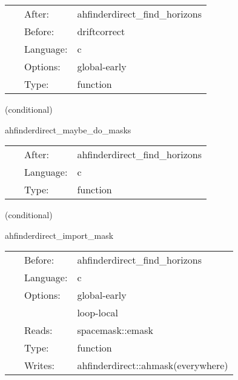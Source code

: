  \begin{tabular*}{160mm}{cll} 
~ & After:  & ahfinderdirect\_find\_horizons \\ 
~ & Before:  & driftcorrect \\ 
~ & Language:  & c \\ 
~ & Options:  & global-early \\ 
~ & Type:  & function \\ 
\end{tabular*} 


\vspace{5mm}

   (conditional) 

\hspace{5mm} ahfinderdirect\_maybe\_do\_masks 

\hspace{5mm}{\it set mask(s) based on apparent horizon position(s) } 


\hspace{5mm}

 \begin{tabular*}{160mm}{cll} 
~ & After:  & ahfinderdirect\_find\_horizons \\ 
~ & Language:  & c \\ 
~ & Type:  & function \\ 
\end{tabular*} 


\vspace{5mm}

   (conditional) 

\hspace{5mm} ahfinderdirect\_import\_mask 

\hspace{5mm}{\it import the excision mask } 


\hspace{5mm}

 \begin{tabular*}{160mm}{cll} 
~ & Before:  & ahfinderdirect\_find\_horizons \\ 
~ & Language:  & c \\ 
~ & Options:  & global-early \\ 
~& ~ &loop-local\\ 
~ & Reads:  & spacemask::emask \\ 
~ & Type:  & function \\ 
~ & Writes:  & ahfinderdirect::ahmask(everywhere) \\ 
\end{tabular*} 


